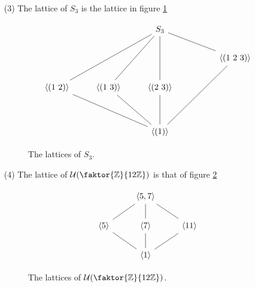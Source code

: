 \begin{example}
\begin{enumerate}
    \item[(3)] The lattice of $S_3$ is the lattice in figure \ref{figure_2.3}
      \begin{figure}[h]
        \[\begin{tikzcd}
  && {S_3} \\
  &&&& {\langle (1 \ 2 \ 3)\rangle} \\
          {\langle (1 \ 2)\rangle} & {\langle (1 \ 3)\rangle} & {\langle (2 \ 3)\rangle} \\
          \\
                                   && {\langle (1)\rangle}
                                   \arrow[no head, from=1-3, to=3-3]
                                   \arrow[no head, from=1-3, to=2-5]
                                   \arrow[no head, from=2-5, to=5-3]
                                   \arrow[no head, from=3-3, to=5-3]
                                   \arrow[no head, from=1-3, to=3-2]
                                   \arrow[no head, from=3-2, to=5-3]
                                   \arrow[no head, from=1-3, to=3-1]
                                   \arrow[no head, from=3-1, to=5-3]
        \end{tikzcd}\]
        \caption{The lattices of $S_3$.}
        \label{figure_2.3}
      \end{figure}

    \item[(4)] The lattice of $\Uc{(\faktor{\Z}{12\Z})}$ is that of figure
      \ref{figure_2.4}
      \begin{figure}[h]
        \[\begin{tikzcd}
  & {\langle 5,7 \rangle} \\
          {\langle 5 \rangle} & {\langle 7 \rangle} & {\langle 11 \rangle} \\
                              & {\langle 1 \rangle}
                              \arrow[no head, from=1-2, to=2-2]
                              \arrow[no head, from=1-2, to=2-1]
                              \arrow[no head, from=2-1, to=3-2]
                              \arrow[no head, from=3-2, to=2-3]
                              \arrow[no head, from=2-3, to=1-2]
                              \arrow[no head, from=2-2, to=3-2]
        \end{tikzcd}\]
        \caption{The lattices of $\Uc{(\faktor{\Z}{12\Z})}$.}
        \label{figure_2.4}
      \end{figure}


\end{enumerate}
\end{example}
